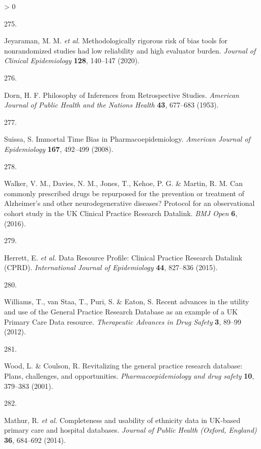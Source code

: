 \documentclass[a4paper, twoside]{templates/ociamthesis}
\newlength{\cslhangindent}
\newlength{\csllabelwidth}
\newenvironment{CSLReferences}[3] %
 {%
  \setlength{\parindent}{0pt}
  \ifodd #1 \everypar{\setlength{\hangindent}{\cslhangindent}}\ignorespaces\fi
  \ifnum #2 > 0
  \setlength{\parskip}{#2\baselineskip}
  \fi
 }%
 {}
\newcommand{\CSLLeftMargin}[1]{\parbox[t]{\maxof{\widthof{#1}}{\csllabelwidth}}{#1}}
\newcommand{\CSLRightInline}[1]{\parbox[t]{\linewidth - \csllabelwidth}{#1}}
\begin{document}
\begin{CSLReferences}{0}{0}
\leavevmode\hypertarget{ref-jeyaraman2020}{}%
\CSLLeftMargin{275. }
\CSLRightInline{Jeyaraman, M. M. \emph{et al.} Methodologically rigorous risk of bias tools for nonrandomized studies had low reliability and high evaluator burden. \emph{Journal of Clinical Epidemiology} \textbf{128}, 140--147 (2020).}

\leavevmode\hypertarget{ref-dorn1953}{}%
\CSLLeftMargin{276. }
\CSLRightInline{Dorn, H. F. Philosophy of {Inferences} from {Retrospective Studies}. \emph{American Journal of Public Health and the Nations Health} \textbf{43}, 677--683 (1953).}

\leavevmode\hypertarget{ref-suissa2008}{}%
\CSLLeftMargin{277. }
\CSLRightInline{Suissa, S. Immortal {Time Bias} in {Pharmacoepidemiology}. \emph{American Journal of Epidemiology} \textbf{167}, 492--499 (2008).}

\leavevmode\hypertarget{ref-walker2016}{}%
\CSLLeftMargin{278. }
\CSLRightInline{Walker, V. M., Davies, N. M., Jones, T., Kehoe, P. G. \& Martin, R. M. Can commonly prescribed drugs be repurposed for the prevention or treatment of {Alzheimer}'s and other neurodegenerative diseases? Protocol for an observational cohort study in the {UK Clinical Practice Research Datalink}. \emph{BMJ Open} \textbf{6}, (2016).}

\leavevmode\hypertarget{ref-herrett2015}{}%
\CSLLeftMargin{279. }
\CSLRightInline{Herrett, E. \emph{et al.} Data {Resource Profile}: Clinical {Practice Research Datalink} ({CPRD}). \emph{International Journal of Epidemiology} \textbf{44}, 827--836 (2015).}

\leavevmode\hypertarget{ref-williams2012}{}%
\CSLLeftMargin{280. }
\CSLRightInline{Williams, T., van Staa, T., Puri, S. \& Eaton, S. Recent advances in the utility and use of the {General Practice Research Database} as an example of a {UK Primary Care Data} resource. \emph{Therapeutic Advances in Drug Safety} \textbf{3}, 89--99 (2012).}

\leavevmode\hypertarget{ref-wood2001revitalizing}{}%
\CSLLeftMargin{281. }
\CSLRightInline{Wood, L. \& Coulson, R. Revitalizing the general practice research database: Plans, challenges, and opportunities. \emph{Pharmacoepidemiology and drug safety} \textbf{10}, 379--383 (2001).}

\leavevmode\hypertarget{ref-mathur2014}{}%
\CSLLeftMargin{282. }
\CSLRightInline{Mathur, R. \emph{et al.} Completeness and usability of ethnicity data in {UK}-based primary care and hospital databases. \emph{Journal of Public Health (Oxford, England)} \textbf{36}, 684--692 (2014).}


\end{CSLReferences}
\end{document}
